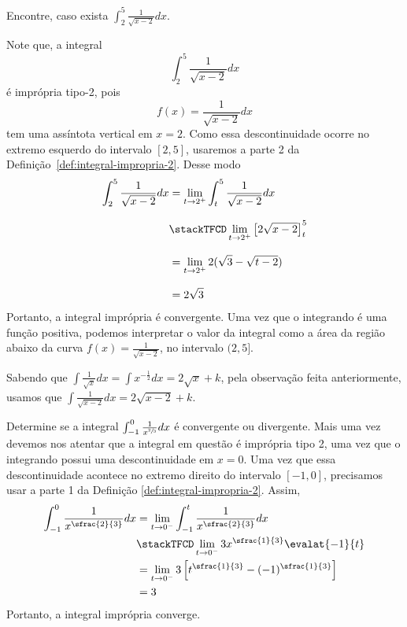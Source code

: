 \begin{example}
  Encontre, caso exista
  \(
    \int_{2}^5 \frac{1}{\sqrt{x-2}} dx
  \).

  \solution
  Note que, a integral
  \[
    \int_{2}^5 \frac{1}{\sqrt{x-2}} dx
  \]
  é imprópria tipo-2, pois
  \[
    f(x) =\frac{1}{\sqrt{x-2}} dx
  \]
  tem uma assíntota vertical em $x=2$.
  Como essa descontinuidade ocorre no extremo esquerdo do intervalo $[2, 5]$,
  usaremos a parte 2 da Definição~\ref{def:integral-impropria-2}. Desse modo
  \begin{align*}
    \int_{2}^5 \frac{1}{\sqrt{x-2}} dx
    & = \lim_{t \to 2^{+}} \int_{t}^5 \frac{1}{\sqrt{x-2}} dx  \\[3mm]
    &\stackTFCD \lim_{t \to 2^{+}} \left[ 2 \sqrt{x-2} \right]_t^5 \\[3mm]
    & = \lim_{t \to 2^{+}}2(\sqrt{3}-\sqrt{t-2})  \\[3mm]
    & = 2\sqrt{3}
  \end{align*}
  Portanto, a integral imprópria é convergente. Uma vez que o integrando
  é uma função positiva, podemos interpretar o valor da integral como a
  área da região abaixo da curva \(f(x)=\frac{1}{\sqrt{x-2}}\),
  no intervalo $(2, 5]$.

  Sabendo que
  \(\int \frac{1}{\sqrt{x}}dx= \int x^{-\frac{1}{2}}dx = 2\sqrt{x}+k\),
  pela observação feita anteriormente, usamos que
  \(\int \frac{1}{\sqrt{x-2}}dx= 2\sqrt{x-2}+k\).
\end{example}

\begin{example}
  Determine se a integral
  \(\int_{-1}^{0} \frac{1}{x^{\sfrac{2}{3}}}dx\)
  é convergente ou divergente.
  \solution
  Mais uma vez devemos nos atentar que a integral em questão é imprópria tipo 2,
  uma vez que o integrando possui uma descontinuidade em $x=0$.
  Uma vez que essa descontinuidade acontece no extremo direito do intervalo
  $[-1, 0]$, precisamos usar a parte 1 da Definição \ref{def:integral-impropria-2}.
  Assim,
  \begin{align*}
    \int_{-1}^{0} \frac{1}{x^{\sfrac{2}{3}}}dx
    & = \lim_{t \to 0^{-}}
        \int_{-1}^{t}
        \frac{1}{x^{\sfrac{2}{3}}}dx  \\
    & \stackTFCD
      \lim_{t \to 0^{-}}
      3x^{\sfrac{1}{3}} \evalat{-1}{t} \\
    & = \lim_{t \to 0^{-}}
      3 \left[ t^{\sfrac{1}{3}} - (-1)^{\sfrac{1}{3}} \right] \\
    & = 3
  \end{align*}
  Portanto, a integral imprópria converge.
\end{example}

